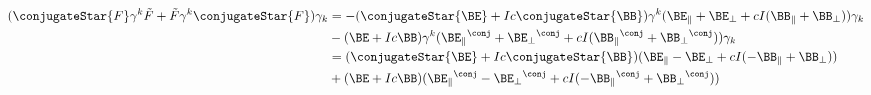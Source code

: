 \begin{align*}
(\conjugateStar{F} \gamma^k \tilde{F} + \tilde{F} \gamma^k \conjugateStar{F}) \gamma_k
&= 
- (\conjugateStar{\BE} + I c \conjugateStar{\BB}) \gamma^k ( \BE_\parallel + \BE_\perp + c I ( \BB_\parallel + \BB_\perp ) ) \gamma_k \\
&- (\BE + I c \BB) \gamma^k ( {\BE_\parallel}^\conj + {\BE_\perp}^\conj + c I ( {\BB_\parallel}^\conj + {\BB_\perp}^\conj ) ) \gamma_k \\
&= 
 (\conjugateStar{\BE} + I c \conjugateStar{\BB}) ( \BE_\parallel - \BE_\perp + c I ( -\BB_\parallel + \BB_\perp ) ) \\
&+ (\BE + I c \BB) ( {\BE_\parallel}^\conj - {\BE_\perp}^\conj + c I ( -{\BB_\parallel}^\conj + {\BB_\perp}^\conj ) ) \\
\end{align*}

